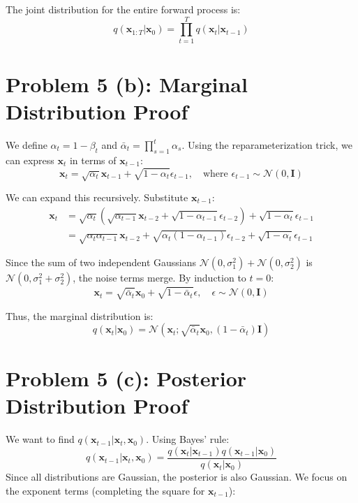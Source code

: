 \documentclass[12pt]{article}
\begin{document}
The joint distribution for the entire forward process is:
\[
    q(\mathbf{x}_{1:T} | \mathbf{x}_0) = \prod_{t=1}^T q(\mathbf{x}_t | \mathbf{x}_{t-1})
\]

\section*{Problem 5 (b): Marginal Distribution Proof}

We define $\alpha_t = 1 - \beta_t$ and $\bar{\alpha}_t = \prod_{s=1}^t \alpha_s$.
Using the reparameterization trick, we can express $\mathbf{x}_t$ in terms of $\mathbf{x}_{t-1}$:
\[
    \mathbf{x}_t = \sqrt{\alpha_t}\mathbf{x}_{t-1} + \sqrt{1-\alpha_t}\epsilon_{t-1}, \quad \text{where } \epsilon_{t-1} \sim \mathcal{N}(0, \mathbf{I})
\]

We can expand this recursively. Substitute $\mathbf{x}_{t-1}$:
\[
\begin{aligned}
    \mathbf{x}_t &= \sqrt{\alpha_t}(\sqrt{\alpha_{t-1}}\mathbf{x}_{t-2} + \sqrt{1-\alpha_{t-1}}\epsilon_{t-2}) + \sqrt{1-\alpha_t}\epsilon_{t-1} \\
    &= \sqrt{\alpha_t \alpha_{t-1}}\mathbf{x}_{t-2} + \sqrt{\alpha_t(1-\alpha_{t-1})}\epsilon_{t-2} + \sqrt{1-\alpha_t}\epsilon_{t-1}
\end{aligned}
\]

Since the sum of two independent Gaussians $\mathcal{N}(0, \sigma_1^2) + \mathcal{N}(0, \sigma_2^2)$ is $\mathcal{N}(0, \sigma_1^2 + \sigma_2^2)$, the noise terms merge. By induction to $t=0$:
\[
    \mathbf{x}_t = \sqrt{\bar{\alpha}_t}\mathbf{x}_0 + \sqrt{1-\bar{\alpha}_t}\epsilon, \quad \epsilon \sim \mathcal{N}(0, \mathbf{I})
\]

Thus, the marginal distribution is:
\[
    q(\mathbf{x}_t | \mathbf{x}_0) = \mathcal{N}(\mathbf{x}_t; \sqrt{\bar{\alpha}_t}\mathbf{x}_0, (1 - \bar{\alpha}_t)\mathbf{I})
\]

\section*{Problem 5 (c): Posterior Distribution Proof}

We want to find $q(\mathbf{x}_{t-1} | \mathbf{x}_t, \mathbf{x}_0)$. Using Bayes' rule:
\[
    q(\mathbf{x}_{t-1} | \mathbf{x}_t, \mathbf{x}_0) = \frac{q(\mathbf{x}_t | \mathbf{x}_{t-1}) q(\mathbf{x}_{t-1} | \mathbf{x}_0)}{q(\mathbf{x}_t | \mathbf{x}_0)}
\]
Since all distributions are Gaussian, the posterior is also Gaussian. We focus on the exponent terms (completing the square for $\mathbf{x}_{t-1}$):
\end{document}
